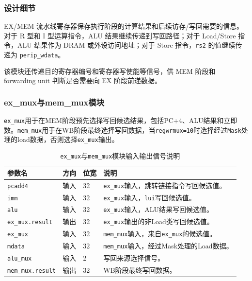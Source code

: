 \documentclass[12pt,a4paper]{ctexart}
\newcommand{\code}[1]{\texttt{#1}}
\begin{document}
\subsubsection*{设计细节}

EX/MEM 流水线寄存器保存执行阶段的计算结果和后续访存/写回需要的信息。对于 R 型和 I 型运算指令，ALU 结果继续传递到写回路径；对于 Load/Store 指令，ALU 结果作为 DRAM 或外设访问地址；对于 Store 指令，\code{rs2} 的值继续传递为 \code{perip\_wdata}。

该模块还传递目的寄存器编号和寄存器写使能等信号，供 MEM 阶段和 forwarding unit 判断是否需要向 EX 阶段前递数据。

\subsubsection{ex\_mux与mem\_mux模块}

\code{ex\_mux}用于在MEM阶段预先选择写回候选结果，包括PC+4、ALU结果和立即数。\code{mem\_mux}用于在WB阶段最终选择写回数据，当\code{regwrmux=10}时选择经过\code{Mask}处理的load数据，否则选择\code{ex\_mux}输出。

\begin{table}[H]
	\centering
	\caption{\code{ex\_mux}与\code{mem\_mux}模块输入输出信号说明}
	\footnotesize
	\renewcommand{\arraystretch}{1.15}
	\begin{tabularx}{\textwidth}{p{3.2cm}p{1.5cm}p{2.1cm}X}
		\toprule
		参数名                    & 方向 & 位宽 & 说明                                      \\
		\midrule
		\code{pcadd4}          & 输入 & 32 & \code{ex\_mux}输入，跳转链接指令写回候选值。           \\
		\code{imm}             & 输入 & 32 & \code{ex\_mux}输入，\code{lui}写回候选值。       \\
		\code{alu}             & 输入 & 32 & \code{ex\_mux}输入，ALU结果写回候选值。            \\
		\code{ex\_mux.result}  & 输出 & 32 & \code{ex\_mux}输出的非Load类写回候选值。           \\
		\code{ex\_mux}         & 输入 & 32 & \code{mem\_mux}输入，来自\code{ex\_mux}的候选值。 \\
		\code{mdata}           & 输入 & 32 & \code{mem\_mux}输入，经过Mask处理的Load数据。      \\
		\code{alu\_mux}        & 输入 & 2  & 写回来源选择信号。                               \\
		\code{mem\_mux.result} & 输出 & 32 & WB阶段最终写回数据。                             \\
		\bottomrule
	\end{tabularx}
\end{table}
\end{document}
